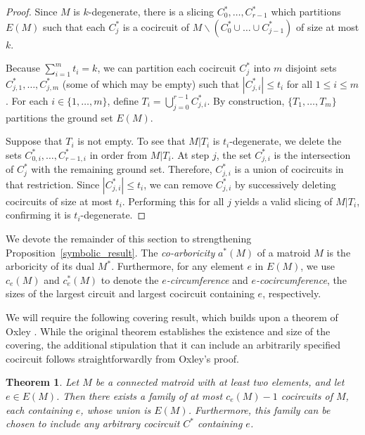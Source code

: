 \documentclass{amsart}
\newcommand{\ba}{\backslash}
\newtheorem{theorem}{Theorem}[section]
\theoremstyle{definition}
\theoremstyle{remark}
\numberwithin{equation}{section}
\begin{document}
\begin{proof}
Since $M$ is $k$-degenerate, there is a slicing $C_0^*, \ldots, C_{r-1}^*$ which partitions $E(M)$ such that each $C_j^*$ is a cocircuit of $M \ba (C_0^* \cup \ldots \cup C_{j-1}^*)$ of size at most $k$.

Because $\sum_{i=1}^m t_i = k$, we can partition each cocircuit $C_j^*$ into $m$ disjoint sets $C_{j,1}^*, \ldots, C_{j,m}^*$ (some of which may be empty) such that $|C_{j,i}^*| \le t_i$ for all $1 \le i \le m$. For each $i \in \{1, \dots, m\}$, define $T_i = \bigcup_{j=0}^{r-1} C_{j,i}^*$. By construction, $\{T_1, \ldots, T_m\}$ partitions the ground set $E(M)$. 

Suppose that $T_i$ is not empty. To see that $M|T_i$ is $t_i$-degenerate, we delete the sets $C_{0,i}^*, \ldots, C_{r-1,i}^*$ in order from $M|T_i$. At step $j$, the set $C_{j,i}^*$ is the intersection of $C_j^*$ with the remaining ground set. Therefore, $C_{j,i}^*$ is a union of cocircuits in that restriction. Since $|C_{j,i}^*| \le t_i$, we can remove $C^*_{j,i}$ by successively deleting cocircuits of size at most $t_i$. Performing this for all $j$ yields a valid slicing of $M|T_i$, confirming it is $t_i$-degenerate.
\end{proof}



We devote the remainder of this section to strengthening Proposition~\ref{symbolic_result}. The \textit{co-arboricity} $a^*(M)$ of a matroid $M$ is the arboricity of its dual $M^*$. Furthermore, for any element $e$ in $E(M)$, we use $c_e(M)$ and $c^*_e(M)$ to denote the \textit{$e$-circumference} and \textit{$e$-cocircumference}, the sizes of the largest circuit and largest cocircuit containing $e$, respectively.


We will require the following covering result, which builds upon a theorem of Oxley \cite[Theorem 4.3.13]{Oxl11}. While the original theorem establishes the existence and size of the covering, the additional stipulation that it can include an arbitrarily specified cocircuit follows straightforwardly from Oxley's proof.

\begin{theorem}
\label{covering}
Let $M$ be a connected matroid with at least two elements, and let $e \in E(M)$. Then there exists a family of at most $c_e(M)-1$ cocircuits of $M$, each containing $e$, whose union is $E(M)$. Furthermore, this family can be chosen to include any arbitrary cocircuit $C^*$ containing $e$. 
\end{theorem}
\end{document}
